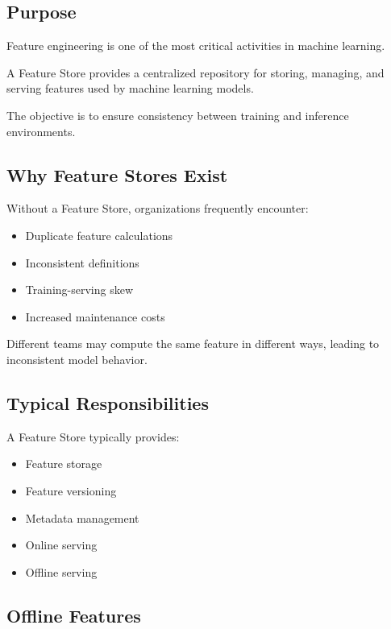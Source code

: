 \subsection{Purpose}

Feature engineering is one of the most critical activities in machine learning.

A Feature Store provides a centralized repository for storing, managing, and serving features used by machine learning models.

The objective is to ensure consistency between training and inference environments.

\subsection{Why Feature Stores Exist}

Without a Feature Store, organizations frequently encounter:

\begin{itemize}
    \item Duplicate feature calculations
    \item Inconsistent definitions
    \item Training-serving skew
    \item Increased maintenance costs
\end{itemize}

Different teams may compute the same feature in different ways, leading to inconsistent model behavior.

\subsection{Typical Responsibilities}

A Feature Store typically provides:

\begin{itemize}
    \item Feature storage
    \item Feature versioning
    \item Metadata management
    \item Online serving
    \item Offline serving
\end{itemize}

\subsection{Offline Features}

